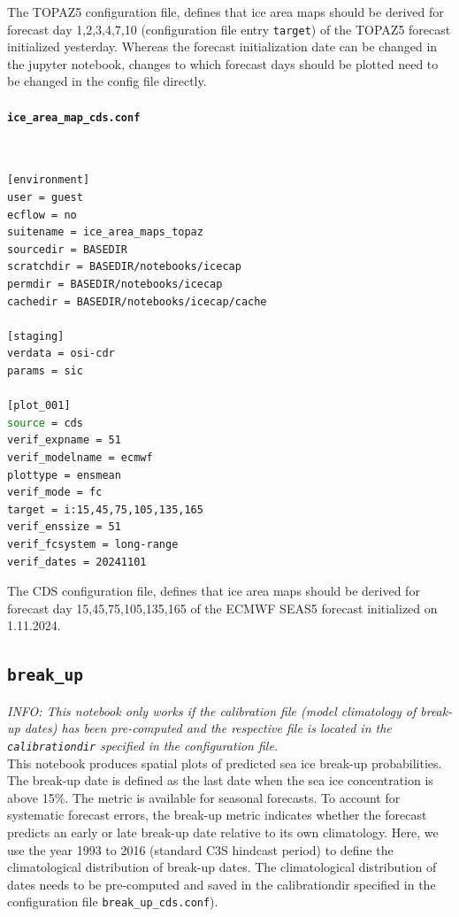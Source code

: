 \documentclass[DIV=10, parskip=full]{scrreprt}
\newcommand{\info}[1]{\textit{INFO: #1}}
\begin{document}
The TOPAZ5 configuration file, defines that ice area maps should be derived for forecast day 1,2,3,4,7,10 (configuration file entry \texttt{target}) of the TOPAZ5 forecast initialized yesterday. Whereas the forecast initialization date can be changed in the jupyter notebook, changes to which forecast days should be plotted need to be changed in the config file directly.

\paragraph{\texttt{ice\_area\_map\_cds.conf}}\mbox{}\\

\begin{lstlisting}[language=bash]
[environment]
user = guest
ecflow = no
suitename = ice_area_maps_topaz
sourcedir = BASEDIR
scratchdir = BASEDIR/notebooks/icecap
permdir = BASEDIR/notebooks/icecap
cachedir = BASEDIR/notebooks/icecap/cache

[staging]
verdata = osi-cdr
params = sic

[plot_001]
source = cds
verif_expname = 51
verif_modelname = ecmwf
plottype = ensmean
verif_mode = fc
target = i:15,45,75,105,135,165
verif_enssize = 51
verif_fcsystem = long-range
verif_dates = 20241101
\end{lstlisting}

The CDS configuration file, defines that ice area maps should be derived for forecast day 15,45,75,105,135,165 of the ECMWF SEAS5 forecast initialized on 1.11.2024. 

\subsection{\texttt{break\_up}}
\info{This notebook only works if the calibration file (model climatology of break-up dates) has been pre-computed and the respective file is located in the \texttt{calibrationdir} specified in the configuration file.}\\

This notebook produces spatial plots of predicted sea ice break-up probabilities. The break-up date is defined as the last date when the sea ice concentration is above 15\%. The metric is available for seasonal forecasts. To account for systematic forecast errors, the break-up metric indicates whether the forecast predicts an early or late break-up date relative to its own climatology. Here, we use the year 1993 to 2016 (standard C3S hindcast period) to define the climatological distribution of break-up dates. The climatological distribution of dates needs to be pre-computed and saved in the calibrationdir specified in the configuration file  \texttt{break\_up\_cds.conf}).
\end{document}

